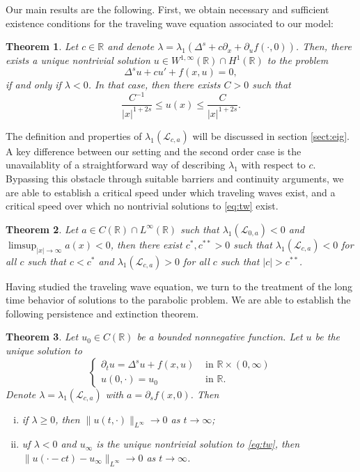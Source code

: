 \documentclass[11pt,a4paper]{amsart}
\newcommand{\Lop}{\mathcal{L}}
\newcommand{\R}{\mathbb{R}}
\newtheorem{mainthm}{Theorem}
\begin{document}
Our main results are the following. First, we obtain necessary and sufficient existence conditions for the traveling wave equation associated to our model:
\begin{mainthm}
\label{thm:tw}
Let $c\in\R$ and denote $\lambda = \lambda_1(\Delta^s + c\partial_x + \partial_u f(\cdot, 0))$. Then, there exists a unique nontrivial solution $u\in W^{1,\infty}(\R) \cap H^1(\R)$ to the problem
\begin{equation}
\tag{TW}\label{eq:tw}
\Delta^s u + cu' + f(x,u) = 0,
\end{equation}
if and only if $\lambda < 0$. In that case, then there exists $C>0$ such that 
\[ \frac{C^{-1}}{|x|^{1+2s}} \leq u(x) \leq \frac{C}{|x|^{1+2s}}.\]
\end{mainthm}

The definition and properties of $\lambda_1(\Lop_{c,a})$ will be discussed in section \ref{sect:eig}. A key difference between our setting and the second order case is the unavailablity of a straightforward way of describing $\lambda_1$ with respect to $c$. Bypassing this obstacle through suitable barriers and continuity arguments, we are able to establish a critical speed under which traveling waves exist, and a critical speed over which no nontrivial solutions to \eqref{eq:tw} exist.
\begin{mainthm}
\label{thm:thresholds}
Let $a\in C(\R) \cap L^{\infty}(\R)$ such that $\lambda_1(\Lop_{0,a})< 0$ and $\limsup_{|x|\rightarrow \infty} a(x) <0$, then there exist $c^*, c^{**}>0$ such that $\lambda_1(\Lop_{c,a}) < 0$ for all $c$ such that $c< c^*$ and $\lambda_1(\Lop_{c,a}) > 0$ for all $c$ such that $|c|>c^{**}$.
\end{mainthm}

Having studied the traveling wave equation, we turn to the treatment of the long time behavior of solutions to the parabolic problem. We are able to establish the following persistence and extinction theorem.
\begin{mainthm}
\label{thm:convergence}
Let $u_0 \in C(\R)$ be a bounded nonnegative function. Let $u$ be the unique solution to 
\begin{equation}
\label{eq:parabolic}
\begin{cases}
\partial_t u = \Delta^su + f(x,u) & \text{ in } \R \times (0,\infty)\\
u(0,\cdot) = u_0 & \text{ in } \R.
\end{cases}
\end{equation} 
Denote $\lambda = \lambda_1(\Lop_{c,a})$ with $a = \partial_s f(x,0)$. Then
\begin{enumerate}[(i)]
\item if $\lambda \geq 0$, then $\|u(t, \cdot)\|_{L^{\infty}} \rightarrow 0$ as $t\rightarrow \infty$;
\item uf $\lambda < 0$ and $u_{\infty}$ is the unique nontrivial solution to \eqref{eq:tw}, then $\|u(\cdot -ct) - u_{\infty}\|_{L^{\infty}} \rightarrow 0$ as $t\rightarrow \infty$.
\end{enumerate}
\end{mainthm}
\end{document}

